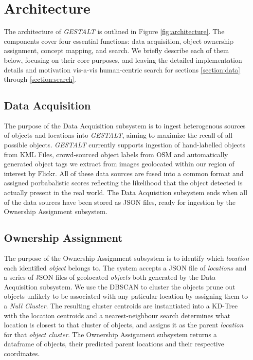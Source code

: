 \section{Architecture}
\label{section:architecture}

\begin{figure*}[t]
    
    \centering
    \caption[width=\textwidth]{The architecture of \emph{GESTALT} consists of the data collection subsystem, the ownership assignment process, the concept mapping process and the search subsystem.}
    \label{fig:architecture}
\end{figure*}

The architecture of \textit{GESTALT} is outlined in Figure \ref{fig:architecture}. The components cover four essential functions: data acquisition, object ownership assignment, concept mapping, and search. 
We briefly describe each of them below, focusing on their core purposes, and leaving the detailed implementation details and motivation vis-a-vis human-centric search for sections \ref{section:data} through \ref{section:search}. 

\subsection{Data Acquisition}
The purpose of the Data Acquisition subsystem is to ingest heterogenous sources of objects and locations into \emph{GESTALT}, aiming to maximize the recall of all possible objects. 
\emph{GESTALT} currently supports ingestion of hand-labelled objects from KML Files, crowd-sourced object labels from OSM and automatically generated object tags we extract from images geolocated within our region of interest by Flickr.
All of these data sources are fused into a common format and assigned porbabalistic scores reflecting the likelihood that the object detected is actually present in the real world. 
The Data Acquisition subsystem ends when all of the data sources have been stored as JSON files, ready for ingestion by the Ownership Assignment subsystem. 

\subsection{Ownership Assignment}
The purpose of the Ownership Assignment subsystem is to identify which \textit{location} each identified \textit{object} belongs to. 
The system accepts a JSON file of \textit{locations} and a series of JSON files of geolocated \textit{objects} both generated by the Data Acquisition subsystem. 
We use the DBSCAN  to cluster the objects prune out objects unlikely to be associated with any paticular location by assigning them to a \textit{Null Cluster}. 
The resulting cluster centroids are instantiated into a KD-Tree with the location centroids and a nearest-neighbour search determines what location is closest to that cluster of objects, and assigns it as the parent \textit{location} for that \textit{object cluster}.
The Ownership Assignment subsystem returns a dataframe of objects, their predicted parent locations and their respective coordinates. 

